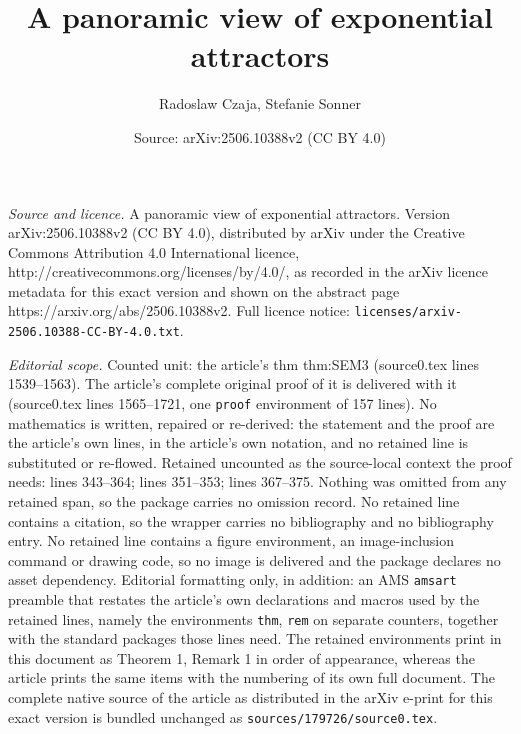 \documentclass[10pt,a4paper]{amsart}
\title{A panoramic view of exponential attractors}
\author{Radoslaw Czaja, Stefanie Sonner}
\date{Source: arXiv:2506.10388v2 (CC BY 4.0)}
\begin{document}
\maketitle

\noindent\emph{Source and licence.} A panoramic view of exponential attractors. Version arXiv:2506.10388v2 (CC BY 4.0), distributed by arXiv under the Creative Commons Attribution 4.0 International licence, http://creativecommons.org/licenses/by/4.0/, as recorded in the arXiv licence metadata for this exact version and shown on the abstract page https://arxiv.org/abs/2506.10388v2. Full licence notice: \texttt{licenses/arxiv-2506.10388-CC-BY-4.0.txt}.\par\smallskip

\noindent\textit{Editorial scope.} Counted unit: the article's thm thm:SEM3 (source0.tex lines 1539--1563). The article's complete original proof of it is delivered with it (source0.tex lines 1565--1721, one \texttt{proof} environment of 157 lines). No mathematics is written, repaired or re-derived: the statement and the proof are the article's own lines, in the article's own notation, and no retained line is substituted or re-flowed.  Retained uncounted as the source-local context the proof needs: lines 343--364; lines 351--353; lines 367--375.  Nothing was omitted from any retained span, so the package carries no omission record.  No retained line contains a citation, so the wrapper carries no bibliography and no bibliography entry.  No retained line contains a figure environment, an image-inclusion command or drawing code, so no image is delivered and the package declares no asset dependency.  Editorial formatting only, in addition: an AMS \texttt{amsart} preamble that restates the article's own declarations and macros used by the retained lines, namely the environments \texttt{thm}, \texttt{rem} on separate counters, together with the standard packages those lines need.  The retained environments print in this document as Theorem 1, Remark 1 in order of appearance, whereas the article prints the same items with the numbering of its own full document.  The complete native source of the article as distributed in the arXiv e-print for this exact version is bundled unchanged as \texttt{sources/179726/source0.tex}.
\end{document}
